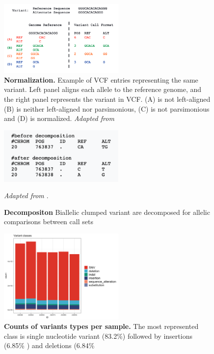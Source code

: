 \begin{figure}[H]
\centering
\includegraphics[width=0.55\textwidth]{fig/vtNormalizeTan.png}
\decoRule
\caption{\textbf{Normalization.} Example  of  VCF  entries  representing  the  same  variant. Left  panel aligns each allele to the reference genome, and the right panel represents the variant in VCF. (A) is not left-aligned (B) is neither left-aligned nor parsimonious, (C) is not parsimonious and (D) is normalized. \textit{ Adapted from \cite{tan2015unified}}}
\label{fig:vtNorm}
\end{figure}

\vspace{2cm}

\begin{figure}[H]
\centering
\includegraphics[width=0.55\textwidth]{fig/vtDecompose.png}
\decoRule
\caption{\textbf{Decompositon} Biallelic clumped variant are decomposed for allelic comparisons between call sets} \textit{ Adapted from \cite{tan2015unified}}. 
\label{fig:vtDecomp}
\end{figure}

\begin{figure}[H]
\centering
\includegraphics[width=0.55\textwidth]{fig/variantClass.png}
\decoRule
\caption{\textbf{Counts of variants types per sample.} The most represented class is single nucleotide variant (83.2\%) followed by insertions (6.85\% ) and deletions (6.84\% }
\label{fig:variantClass}
\end{figure}

